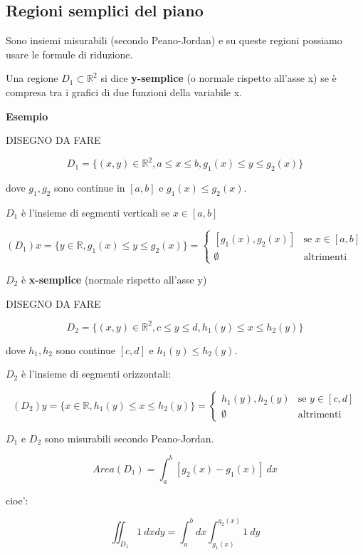 \documentclass[../appunti-analisi.tex]{subfiles}
\begin{document}
\newpage 

\subsection{Regioni semplici del piano}

Sono insiemi misurabili (secondo Peano-Jordan) e su queste regioni possiamo usare le formule di riduzione.

Una regione $D_1 \subset \mathbb{R}^{2}$ si dice \textbf{y-semplice} (o normale rispetto all'asse x) se è compresa tra i grafici di due funzioni della variabile x.

\textbf{Esempio} 

DISEGNO DA FARE

\[
    D_1= \{(x,y) \in \mathbb{R}^{2}, a \le x \le b, g_1(x) \le y \le g_2(x)\}
\]

dove $g_1,g_2$ sono continue in $[a,b]$ e $g_1(x) \le g_2(x)$.

$D_1$ è l'insieme di segmenti verticali se $x \in [a,b]$

\[
    (D_1)x = \{y \in \mathbb{R}, g_1(x) \le y \le g_2(x)\} = \begin{cases}
        [g_1(x),g_2(x)] & \text{se $x \in [a,b]$} \\
        \emptyset & \text{altrimenti}
    \end{cases}
\]

$D_2$ è \textbf{x-semplice} (normale rispetto all'asse y)

DISEGNO DA FARE


\[
    D_2= \{(x,y) \in \mathbb{R}^{2}, c \le y \le d, h_1(y) \le x \le h_2(y)\}
\]
 
dove $h_1,h_2$ sono continue $[c,d]$ e $h_1(y) \le h_2(y)$.

$D_2$ è l'insieme di segmenti orizzontali:

\[
    (D_2) y = \{x \in \mathbb{R}, h_1(y) \le x \le h_2(y)\} = \begin{cases}
        h_1(y),h_2(y) & \text{se $y \in [c,d]$} \\
        \emptyset & \text{altrimenti}
    \end{cases}
\]


$D_1$ e $D_2$ sono misurabili secondo Peano-Jordan.

\[
    Area(D_1) = \int_{a}^{b} {[g_2(x) -g_1(x)]} \: dx 
\]

cioe':

\[
    \iint_{D_1} {1} \: d x d y = \int_{a}^{b} {dx \int_{g_1(x)}^{g_2(x)} {1} \: d y }
\]
\end{document}
